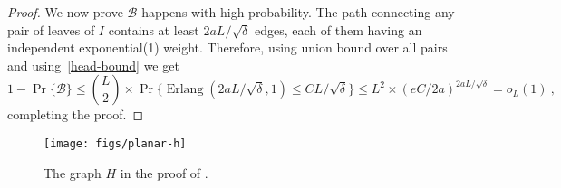 \documentclass{patmorin}
\DeclareMathOperator{\erlang}{Erlang}
\newcommand{\abas}[1]{\textcolor{orange}{\big[Abbas: #1\big]}}
\begin{document}
\begin{proof}
We now prove $\mathcal B$ happens with high probability.
The path connecting
any pair of leaves of $I$ contains at least $2aL/\sqrt \delta$ edges,
each of them having an independent exponential(1) weight.
Therefore, using union bound over all pairs and using~\eqref{head-bound} we get
\[
1-\Pr\{\mathcal B\}
\leq
\binom{L}{2} \times \Pr\{\erlang(2aL/\sqrt \delta,1)\leq CL/\sqrt \delta\}\leq
L^2 \times (eC/2a)^{2aL/\sqrt{\delta}} = o_L(1)\:,
\]
completing the proof.
\end{proof}


%

  \begin{figure}
    \begin{center}
      \texttt{[image: figs/planar-h]}
    \end{center}
    \caption{The graph $H$ in the proof of .}
  \end{figure}
 
%
\end{document}
